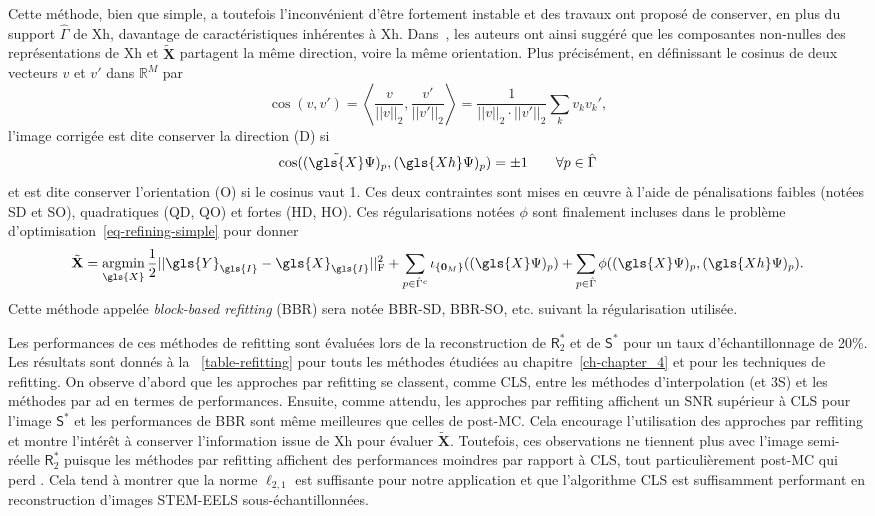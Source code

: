 Cette méthode, bien que simple, a toutefois l'inconvénient d'être fortement instable et des travaux ont proposé de conserver, en plus du support $\hat{\Gamma}$ de \gls{Xh}, davantage de caractéristiques inhérentes à \gls{Xh}. Dans~\cite{deledalle2019block}, les auteurs ont ainsi suggéré que les composantes non-nulles des représentations de \gls{Xh} et $\tilde{\mathbf{X}}$ partagent la même direction, voire la même orientation. Plus précisément, en définissant le cosinus de deux vecteurs $v$ et $v'$ dans $\mathbb{R}^M$ par
\begin{equation}
    \cos(v, v') = \left< \frac{v}{||v||_2} , \frac{v'}{||v'||_2} \right> = \frac{1}{||v||_2\cdot||v'||_2}\sum_k v_kv_k',
\end{equation}
l'image corrigée est dite conserver la direction (D) si 
\begin{equation}
    \cos( (\tilde{\gls{X}}\Psi)_p , (\gls{Xh}\Psi)_p ) = \pm 1 \qquad \forall p\in\hat{\Gamma}
\end{equation}
et est dite conserver l'orientation (O) si le cosinus vaut 1. Ces deux contraintes sont mises en \oe{}uvre à l'aide de pénalisations faibles (notées SD et SO), quadratiques (QD, QO) et fortes (HD, HO). Ces régularisations notées $\phi$ sont finalement incluses dans le problème d'optimisation~\ref{eq-refining-simple} pour donner
\begin{equation}
\tilde{\mathbf{X}} = \argmin_{\gls{X}} 
%
\frac{1}{2}\frobnorm{\gls{Y}_{\gls{I}} - \gls{X}_{\gls{I}}} + 
%
\sum_{p\in\hat{\Gamma}^c} \iota_{\{\mathbf{0}_M\}}((\gls{X}\Psi)_p) +
%
\sum_{p\in\hat{\Gamma}} \phi( (\gls{X}\Psi)_p , (\gls{Xh}\Psi)_p ).
\end{equation}
Cette méthode appelée \emph{block-based refitting} (BBR) sera notée BBR-SD, BBR-SO, etc. suivant la régularisation utilisée.

Les performances de ces méthodes de refitting sont évaluées lors de la reconstruction de $\mathsf{R}_2^*$ et de $\mathsf{S}^*$ pour un taux d'échantillonnage de 20\%. Les résultats sont donnés à la \tabname~\ref{table-refitting} pour touts les méthodes étudiées au chapitre~\ref{ch-chapter_4} et pour les techniques de refitting.
%
On observe d'abord que les approches par refitting se classent, comme CLS, entre les méthodes d'interpolation (et 3S) et les méthodes par \gls{ad} en termes de performances. 
%
Ensuite, comme attendu, les approches par reffiting affichent un SNR supérieur à CLS pour l'image $\mathsf{S}^*$ et les performances de BBR sont même meilleures que celles de post-MC.
%
Cela encourage l'utilisation des approches par reffiting et montre l'intérêt à conserver l'information issue de \gls{Xh} pour évaluer $\tilde{\mathbf{X}}$. 
%
Toutefois, ces observations ne tiennent plus avec l'image semi-réelle $\mathsf{R}_2^*$ puisque les méthodes par refitting affichent des performances moindres par rapport à CLS, tout particulièrement post-MC qui perd . 
%
Cela tend à montrer que la norme $\ell_{2, 1}$ est suffisante pour notre application et que l'algorithme CLS est suffisamment performant en reconstruction d'images STEM-EELS sous-échantillonnées.


